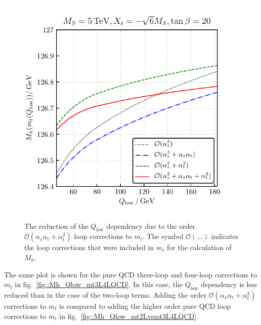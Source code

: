 \documentclass[a4paper,12pt]{book}
\begin{document}
\begin{figure}[h]
\begin{minipage}[t]{0.5\textwidth}
\includegraphics[width=\textwidth]{src/img/Mh_Qlow_mt2L.pdf}
\captionsetup{width=.8\textwidth}
\caption{The reduction of the $Q_\text{low}$ dependency due to the order $\mathcal{O}(\alpha_s\alpha_t+\alpha_t^2)$ loop corrections to $m_t$. The symbol $\mathcal{O}(...)$ indicates the loop corrections that were included in $m_t$ for the calculation of $M_h$.}
\label{fig::Mh_Qlow_mt2L}
\end{minipage}
\end{figure}\par 
The same plot is shown for the pure QCD three-loop and four-loop corrections to $m_t$ in fig.\ \ref{fig::Mh_Qlow_mt3L4LQCD}. In this case, the $Q_\text{low}$ dependency is less reduced than in the case of the two-loop terms. Adding the order $\mathcal{O}(\alpha_s\alpha_t+\alpha_t^2)$ corrections to $m_t$ is compared to adding the higher order pure QCD loop corrections to $m_t$ in fig.\ \ref{fig::Mh_Qlow_mt2Lvsmt3L4LQCD}.
\end{document}
